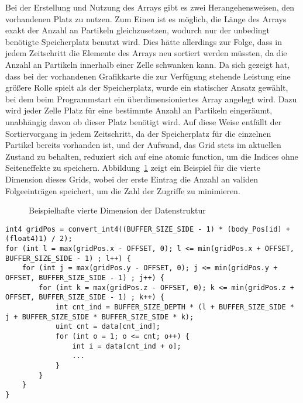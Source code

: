 \noindent Bei der Erstellung und Nutzung des Arrays gibt es zwei Herangehensweisen, den vorhandenen Platz zu nutzen. Zum Einen ist es möglich, die Länge des Arrays exakt der Anzahl an Partikeln gleichzusetzen, wodurch nur der unbedingt benötigte Speicherplatz benutzt wird. Dies hätte allerdings zur Folge, dass in jedem Zeitschritt die Elemente des Arrays neu sortiert werden müssten, da die Anzahl an Partikeln innerhalb einer Zelle schwanken kann. Da sich gezeigt hat, dass bei der vorhandenen Grafikkarte die zur Verfügung stehende Leistung eine größere Rolle spielt als der Speicherplatz, wurde ein statischer Ansatz gewählt, bei dem beim Programmstart ein überdimensioniertes Array angelegt wird. Dazu wird jeder Zelle Platz für eine bestimmte Anzahl an Partikeln eingeräumt, unabhängig davon ob dieser Platz benötigt wird. Auf diese Weise entfällt der Sortiervorgang in jedem Zeitschritt, da der Speicherplatz für die einzelnen Partikel bereits vorhanden ist, und der Aufwand, das Grid stets im aktuellen Zustand zu behalten, reduziert sich auf eine atomic function, um die Indices ohne Seiteneffekte zu speichern. Abbildung~\ref{fig:datenstruktur_eintraege} zeigt ein Beispiel für die vierte Dimension dieses Grids, wobei der erste Eintrag die Anzahl an validen Folgeeinträgen speichert, um die Zahl der Zugriffe zu minimieren.
\begin{figure}[h]
  \centering
    
  \caption{Beispielhafte vierte Dimension der Datenstruktur}
  \label{fig:datenstruktur_eintraege}
\end{figure}

\begin{minipage}{\linewidth}
\begin{lstlisting}[caption=Iteration über benachbarte Partikel, label=lst:grid_for]
int4 gridPos = convert_int4((BUFFER_SIZE_SIDE - 1) * (body_Pos[id] + (float4)1) / 2);
for (int l = max(gridPos.x - OFFSET, 0); l <= min(gridPos.x + OFFSET, BUFFER_SIZE_SIDE - 1) ; l++) {
	for (int j = max(gridPos.y - OFFSET, 0); j <= min(gridPos.y + OFFSET, BUFFER_SIZE_SIDE - 1) ; j++) {
		for (int k = max(gridPos.z - OFFSET, 0); k <= min(gridPos.z + OFFSET, BUFFER_SIZE_SIDE - 1) ; k++) {
			int cnt_ind = BUFFER_SIZE_DEPTH * (l + BUFFER_SIZE_SIDE * j + BUFFER_SIZE_SIDE * BUFFER_SIZE_SIDE * k);
			uint cnt = data[cnt_ind];			
			for (int o = 1; o <= cnt; o++) {
				int i = data[cnt_ind + o];
				...
			}
		}
	}
}
\end{lstlisting}
\end{minipage}

